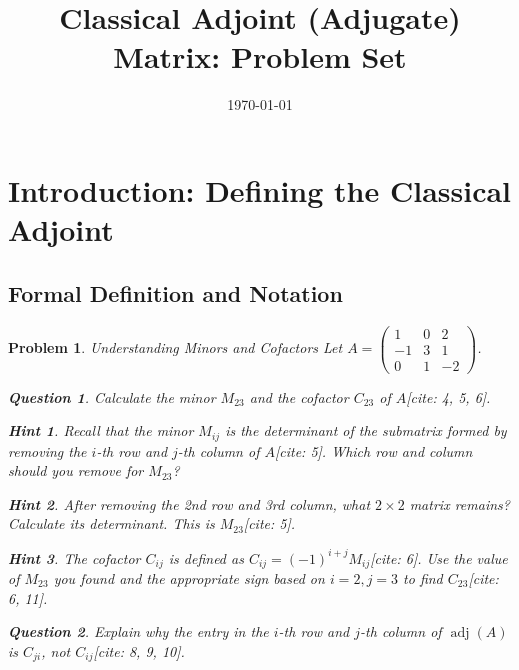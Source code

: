\documentclass[12pt]{article}
\title{Classical Adjoint (Adjugate) Matrix: Problem Set}
\author{}
\date{\today}
\newtheorem{problem}{Problem}[section]
\newtheorem{question}{Question}[problem]
\theoremstyle{definition}
\newtheorem{hint}{Hint}[question]
\newcommand{\adj}{\operatorname{adj}}
\begin{document}
\maketitle

\section{Introduction: Defining the Classical Adjoint}
\subsection{Formal Definition and Notation}

\begin{problem}{Understanding Minors and Cofactors}
    Let $A = \begin{pmatrix} 1 & 0 & 2 \\ -1 & 3 & 1 \\ 0 & 1 & -2 \end{pmatrix}$.
    \begin{question}
        Calculate the minor $M_{23}$ and the cofactor $C_{23}$ of $A$[cite: 4, 5, 6].
    \end{question}
    
        \begin{hint}
            Recall that the minor $M_{ij}$ is the determinant of the submatrix formed by removing the $i$-th row and $j$-th column of $A$[cite: 5]. Which row and column should you remove for $M_{23}$?
        \end{hint}
        \begin{hint}
            After removing the 2nd row and 3rd column, what $2 \times 2$ matrix remains? Calculate its determinant. This is $M_{23}$[cite: 5].
        \end{hint}
        \begin{hint}
            The cofactor $C_{ij}$ is defined as $C_{ij} = (-1)^{i+j} M_{ij}$[cite: 6]. Use the value of $M_{23}$ you found and the appropriate sign based on $i=2, j=3$ to find $C_{23}$[cite: 6, 11].
        \end{hint}
    

    \begin{question}
        Explain why the entry in the $i$-th row and $j$-th column of $\adj(A)$ is $C_{ji}$, not $C_{ij}$[cite: 8, 9, 10].
    \end{question}
    

\end{problem}
\end{document}
